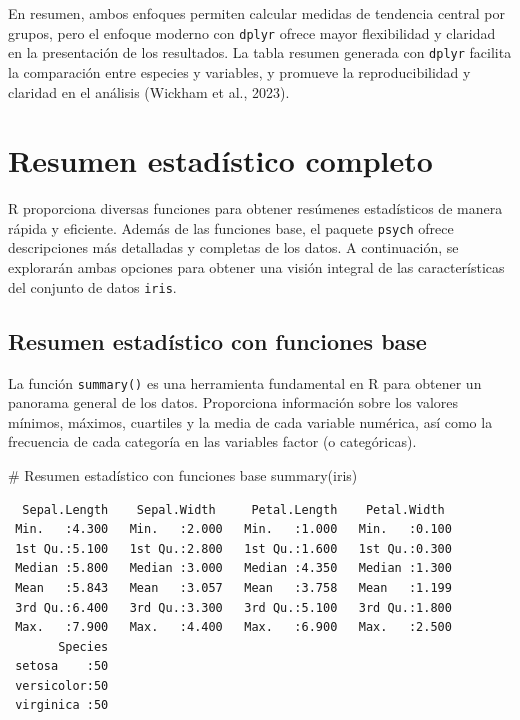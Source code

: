 \documentclass[
  spanish,
  a4paper,
  DIV=11,
  numbers=noendperiod,
  onepage,
  openany]{scrreprt}
\newenvironment{Shaded}{\begin{snugshade}}{\end{snugshade}}
\newcommand{\CommentTok}[1]{\textcolor[rgb]{0.37,0.37,0.37}{#1}}
\newcommand{\FunctionTok}[1]{\textcolor[rgb]{0.28,0.35,0.67}{#1}}
\newcommand{\NormalTok}[1]{\textcolor[rgb]{0.00,0.23,0.31}{#1}}
\begin{document}
En resumen, ambos enfoques permiten calcular medidas de tendencia
central por grupos, pero el enfoque moderno con \texttt{dplyr} ofrece
mayor flexibilidad y claridad en la presentación de los resultados. La
tabla resumen generada con \texttt{dplyr} facilita la comparación entre
especies y variables, y promueve la reproducibilidad y claridad en el
análisis (Wickham et al., 2023).

\section{Resumen estadístico
completo}\label{resumen-estaduxedstico-completo}

R proporciona diversas funciones para obtener resúmenes estadísticos de
manera rápida y eficiente. Además de las funciones base, el paquete
\texttt{psych} ofrece descripciones más detalladas y completas de los
datos. A continuación, se explorarán ambas opciones para obtener una
visión integral de las características del conjunto de datos
\texttt{iris}.

\subsection{Resumen estadístico con funciones
base}\label{resumen-estaduxedstico-con-funciones-base}

La función \texttt{summary()} es una herramienta fundamental en R para
obtener un panorama general de los datos. Proporciona información sobre
los valores mínimos, máximos, cuartiles y la media de cada variable
numérica, así como la frecuencia de cada categoría en las variables
factor (o categóricas).

\begin{Shaded}
\begin{Highlighting}[]
\CommentTok{\# Resumen estadístico con funciones base}
\FunctionTok{summary}\NormalTok{(iris)}
\end{Highlighting}
\end{Shaded}

\begin{verbatim}
  Sepal.Length    Sepal.Width     Petal.Length    Petal.Width   
 Min.   :4.300   Min.   :2.000   Min.   :1.000   Min.   :0.100  
 1st Qu.:5.100   1st Qu.:2.800   1st Qu.:1.600   1st Qu.:0.300  
 Median :5.800   Median :3.000   Median :4.350   Median :1.300  
 Mean   :5.843   Mean   :3.057   Mean   :3.758   Mean   :1.199  
 3rd Qu.:6.400   3rd Qu.:3.300   3rd Qu.:5.100   3rd Qu.:1.800  
 Max.   :7.900   Max.   :4.400   Max.   :6.900   Max.   :2.500  
       Species  
 setosa    :50  
 versicolor:50  
 virginica :50  
                
                
                
\end{verbatim}
\end{document}
